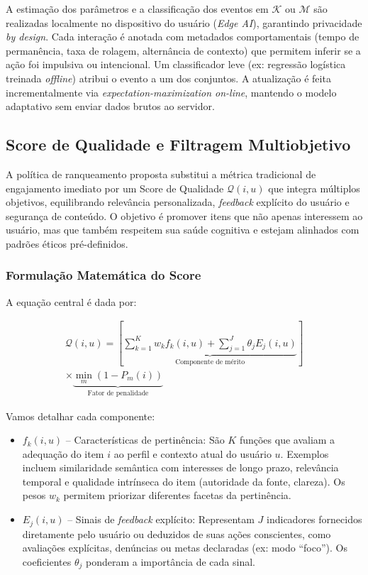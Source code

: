 \documentclass{sbc2023}
\begin{document}
A estimação dos parâmetros e a classificação dos eventos em $\mathcal{K}$ ou $\mathcal{M}$ são realizadas localmente no dispositivo do usuário (\textit{Edge AI}), garantindo privacidade \textit{by design}. Cada interação é anotada com metadados comportamentais (tempo de permanência, taxa de rolagem, alternância de contexto) que permitem inferir se a ação foi impulsiva ou intencional. Um classificador leve (ex: regressão logística treinada \textit{offline}) atribui o evento a um dos conjuntos. A atualização é feita incrementalmente via \textit{expectation-maximization on-line}, mantendo o modelo adaptativo sem enviar dados brutos ao servidor.

\subsection{Score de Qualidade e Filtragem Multiobjetivo} \label{sec:score_method}

A política de ranqueamento proposta substitui a métrica tradicional de engajamento imediato por um Score de Qualidade $\mathcal{Q}(i,u)$ que integra múltiplos objetivos, equilibrando relevância personalizada, \textit{feedback} explícito do usuário e segurança de conteúdo. O objetivo é promover itens que não apenas interessem ao usuário, mas que também respeitem sua saúde cognitiva e estejam alinhados com padrões éticos pré-definidos.

\subsubsection{Formulação Matemática do Score} \label{sec:score_math}

A equação central é dada por:

\begin{multline} \label{eq:score}
    \mathcal{Q}(i,u) = \left[ \underbrace{\sum_{k=1}^{K} w_k f_k(i,u) + \sum_{j=1}^{J} \theta_j E_j (i,u)}_{\text{Componente de mérito}} \right] \\
    \times \underbrace{\min_{m} (1 - P_m(i))}_{\text{Fator de penalidade}}
\end{multline}

Vamos detalhar cada componente:
\begin{itemize}
    \item $f_k(i,u)$ -- Características de pertinência: São $K$ funções que avaliam a adequação do item $i$ ao perfil e contexto atual do usuário $u$. Exemplos incluem similaridade semântica com interesses de longo prazo, relevância temporal e qualidade intrínseca do item (autoridade da fonte, clareza). Os pesos $w_k$ permitem priorizar diferentes facetas da pertinência.
    \item $E_j(i,u)$ -- Sinais de \textit{feedback} explícito: Representam $J$ indicadores fornecidos diretamente pelo usuário ou deduzidos de suas ações conscientes, como avaliações explícitas, denúncias ou metas declaradas (ex: modo ``foco''). Os coeficientes $\theta_j$ ponderam a importância de cada sinal.
\end{itemize}
\end{document}
